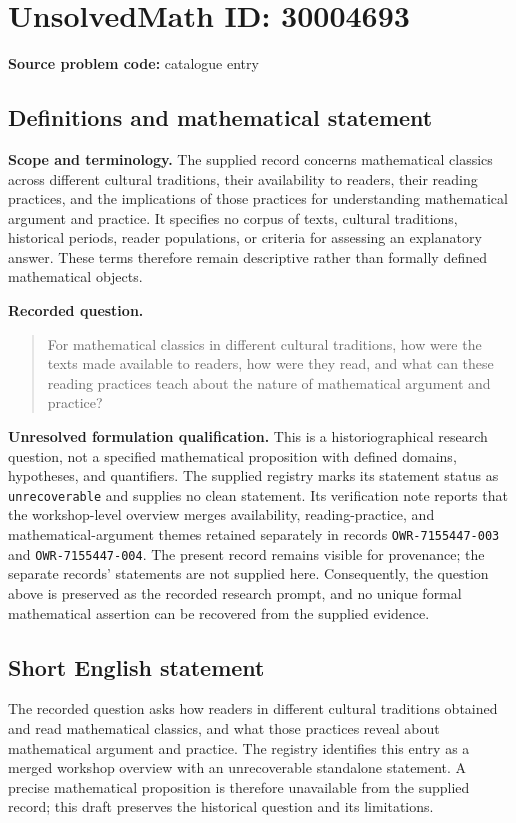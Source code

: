 \documentclass[11pt]{article}
\begin{document}
\section*{UnsolvedMath ID: 30004693}
\textbf{Source problem code:} catalogue entry
\subsection{Definitions and mathematical statement}
\textbf{Scope and terminology.} The supplied record concerns mathematical classics across different cultural traditions, their availability to readers, their reading practices, and the implications of those practices for understanding mathematical argument and practice. It specifies no corpus of texts, cultural traditions, historical periods, reader populations, or criteria for assessing an explanatory answer. These terms therefore remain descriptive rather than formally defined mathematical objects.

\textbf{Recorded question.}
\begin{quote}
For mathematical classics in different cultural traditions, how were the texts made available to readers, how were they read, and what can these reading practices teach about the nature of mathematical argument and practice?
\end{quote}

\textbf{Unresolved formulation qualification.} This is a historiographical research question, not a specified mathematical proposition with defined domains, hypotheses, and quantifiers. The supplied registry marks its statement status as \texttt{unrecoverable} and supplies no clean statement. Its verification note reports that the workshop-level overview merges availability, reading-practice, and mathematical-argument themes retained separately in records \texttt{OWR-7155447-003} and \texttt{OWR-7155447-004}. The present record remains visible for provenance; the separate records' statements are not supplied here. Consequently, the question above is preserved as the recorded research prompt, and no unique formal mathematical assertion can be recovered from the supplied evidence.
\subsection{Short English statement}
The recorded question asks how readers in different cultural traditions obtained and read mathematical classics, and what those practices reveal about mathematical argument and practice. The registry identifies this entry as a merged workshop overview with an unrecoverable standalone statement. A precise mathematical proposition is therefore unavailable from the supplied record; this draft preserves the historical question and its limitations.
\end{document}

